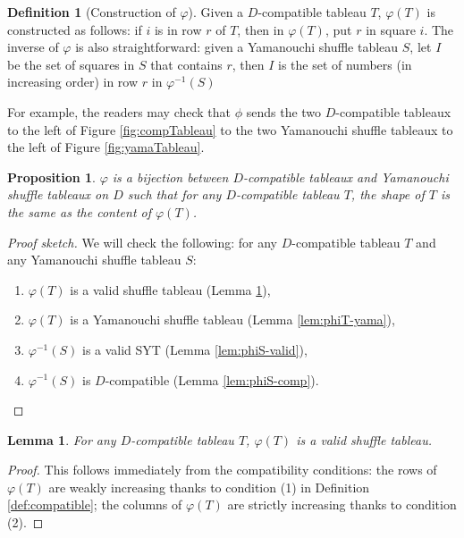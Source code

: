\documentclass[10pt,a4paper]{article}
\newtheorem{prop}[theorem]{Proposition}
\newtheorem{lemma}[theorem]{Lemma}
\theoremstyle{definition}
\newtheorem{defi}[theorem]{Definition}
\numberwithin{equation}{section}
\begin{document}
    \begin{defi}[Construction of $\varphi$]\label{def:yama-comp-bijection}
        Given a $D$-compatible tableau $T$, $\varphi(T)$ is constructed as follows: if $i$ is in row $r$ of $T$, then in $\varphi(T)$, put $r$ in square $i$. The inverse of $\varphi$ is also straightforward: given a Yamanouchi shuffle tableau $S$, let $I$ be the set of squares in $S$ that contains $r$, then $I$ is the set of numbers (in increasing order) in row $r$ in $\varphi^{-1}(S)$
    \end{defi}

    For example, the readers may check that $\phi$ sends the two $D$-compatible tableaux to the left of Figure \ref{fig:compTableau} to the two Yamanouchi shuffle tableaux to the left of Figure \ref{fig:yamaTableau}.


    \begin{prop}
        $\varphi$ is a bijection between $D$-compatible tableaux and Yamanouchi shuffle tableaux on $D$ such that for any $D$-compatible tableau $T$, the shape of $T$ is the same as the content of $\varphi(T)$.
    \end{prop}

    \begin{proof}[Proof sketch]
        We will check the following: for any $D$-compatible tableau $T$ and any Yamanouchi shuffle tableau $S$:

        \begin{enumerate}
            \item $\varphi(T)$ is a valid shuffle tableau (Lemma \ref{lem:phiT-valid}),
            \item $\varphi(T)$ is a Yamanouchi shuffle tableau (Lemma \ref{lem:phiT-yama}),
            \item $\varphi^{-1}(S)$ is a valid SYT (Lemma \ref{lem:phiS-valid}),
            \item $\varphi^{-1}(S)$ is $D$-compatible (Lemma \ref{lem:phiS-comp}). \qedhere
        \end{enumerate}
    \end{proof}

    \begin{lemma}\label{lem:phiT-valid}
        For any $D$-compatible tableau $T$, $\varphi(T)$ is a valid shuffle tableau.
    \end{lemma}

    \begin{proof}
        This follows immediately from the compatibility conditions: the rows of $\varphi(T)$ are weakly increasing thanks to condition (1) in Definition \ref{def:compatible}; the columns of $\varphi(T)$ are strictly increasing thanks to condition (2).
    \end{proof}
\end{document}
